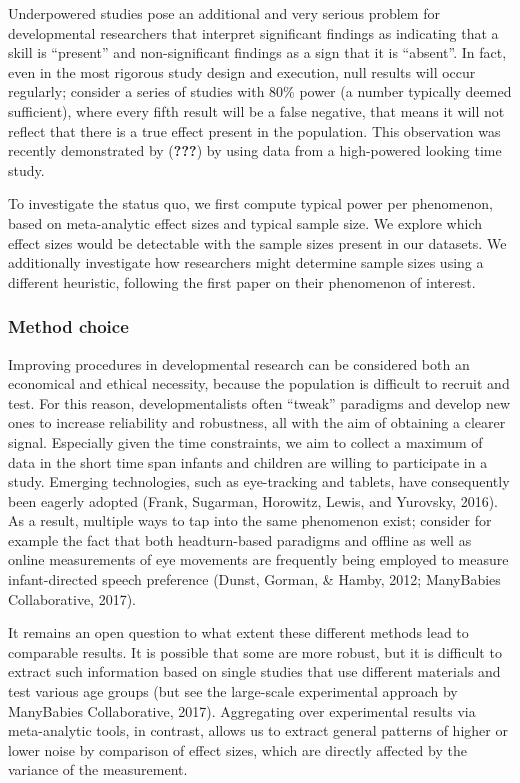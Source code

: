 \documentclass[english,floatsintext,man]{apa6}
\begin{document}
Underpowered studies pose an additional and very serious problem for
developmental researchers that interpret significant findings as
indicating that a skill is \enquote{present} and non-significant
findings as a sign that it is \enquote{absent}. In fact, even in the
most rigorous study design and execution, null results will occur
regularly; consider a series of studies with 80\% power (a number
typically deemed sufficient), where every fifth result will be a false
negative, that means it will not reflect that there is a true effect
present in the population. This observation was recently demonstrated by
({\textbf{???}}) by using data from a high-powered looking time study.

To investigate the status quo, we first compute typical power per
phenomenon, based on meta-analytic effect sizes and typical sample size.
We explore which effect sizes would be detectable with the sample sizes
present in our datasets. We additionally investigate how researchers
might determine sample sizes using a different heuristic, following the
first paper on their phenomenon of interest.

\subsubsection{Method choice}\label{method-choice}

Improving procedures in developmental research can be considered both an
economical and ethical necessity, because the population is difficult to
recruit and test. For this reason, developmentalists often
\enquote{tweak} paradigms and develop new ones to increase reliability
and robustness, all with the aim of obtaining a clearer signal.
Especially given the time constraints, we aim to collect a maximum of
data in the short time span infants and children are willing to
participate in a study. Emerging technologies, such as eye-tracking and
tablets, have consequently been eagerly adopted (Frank, Sugarman,
Horowitz, Lewis, and Yurovsky, 2016). As a result, multiple ways to tap
into the same phenomenon exist; consider for example the fact that both
headturn-based paradigms and offline as well as online measurements of
eye movements are frequently being employed to measure infant-directed
speech preference (Dunst, Gorman, \& Hamby, 2012; ManyBabies
Collaborative, 2017).

It remains an open question to what extent these different methods lead
to comparable results. It is possible that some are more robust, but it
is difficult to extract such information based on single studies that
use different materials and test various age groups (but see the
large-scale experimental approach by ManyBabies Collaborative, 2017).
Aggregating over experimental results via meta-analytic tools, in
contrast, allows us to extract general patterns of higher or lower noise
by comparison of effect sizes, which are directly affected by the
variance of the measurement.
\end{document}
